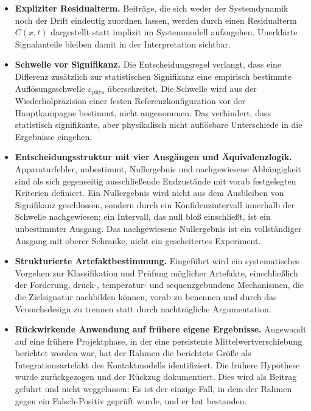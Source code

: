 \documentclass[12pt,a4paper]{report}
\begin{document}
\begin{itemize}
  \item \textbf{Expliziter Residualterm.}
        Beiträge, die sich weder der Systemdynamik noch der Drift
        eindeutig zuordnen lassen, werden durch einen Residualterm
        $C(x,t)$ dargestellt statt implizit im Systemmodell
        aufzugehen. Unerklärte Signalanteile bleiben damit in der
        Interpretation sichtbar.

  \item \textbf{Schwelle vor Signifikanz.}
        Die Entscheidungsregel verlangt, dass eine Differenz zusätzlich
        zur statistischen Signifikanz eine empirisch bestimmte
        Auflösungsschwelle $\varepsilon_{\mathrm{phys}}$ überschreitet.
        Die Schwelle wird aus der Wiederholpräzision einer festen
        Referenzkonfiguration vor der Hauptkampagne bestimmt, nicht
        angenommen. Das verhindert, dass statistisch signifikante, aber
        physikalisch nicht auflösbare Unterschiede in die Ergebnisse
        eingehen.

  \item \textbf{Entscheidungsstruktur mit vier Ausgängen und
        Äquivalenzlogik.}
        Apparaturfehler, unbestimmt, Nullergebnis und nachgewiesene
        Abhängigkeit sind als sich gegenseitig ausschließende Endzustände
        mit vorab festgelegten Kriterien definiert. Ein Nullergebnis
        wird nicht aus dem Ausbleiben von Signifikanz geschlossen,
        sondern durch ein Konfidenzintervall innerhalb der Schwelle
        nachgewiesen; ein Intervall, das null bloß einschließt, ist ein
        unbestimmter Ausgang. Das nachgewiesene Nullergebnis ist ein
        vollständiger Ausgang mit oberer Schranke, nicht ein
        gescheitertes Experiment.

  \item \textbf{Strukturierte Artefaktbestimmung.}
        Eingeführt wird ein systematisches Vorgehen zur Klassifikation
        und Prüfung möglicher Artefakte, einschließlich der Forderung,
        druck-, temperatur- und sequenzgebundene Mechanismen, die die
        Zielsignatur nachbilden können, vorab zu benennen und durch das
        Versuchsdesign zu trennen statt durch nachträgliche Argumentation.

  \item \textbf{Rückwirkende Anwendung auf frühere eigene Ergebnisse.}
        Angewandt auf eine frühere Projektphase, in der eine persistente
        Mittelwertverschiebung berichtet worden war, hat der Rahmen die
        berichtete Größe als Integrationsartefakt des Kontaktmodells
        identifiziert. Die frühere Hypothese wurde zurückgezogen und der
        Rückzug dokumentiert. Dies wird als Beitrag geführt und nicht
        weggelassen: Es ist der einzige Fall, in dem der Rahmen gegen ein
        Falsch-Positiv geprüft wurde, und er hat bestanden.

\end{itemize}
\end{document}
